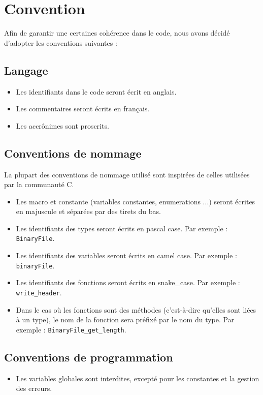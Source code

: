 \section{Convention}

Afin de garantir une certaines cohérence dans le code, nous avons décidé d'adopter les conventions suivantes :

\subsection{Langage}

\begin{itemize}
    \item Les identifiants dans le code seront écrit en anglais.
    \item Les commentaires seront écrits en français.
    \item Les accrônimes sont proscrits.
\end{itemize}


\subsection{Conventions de nommage}

La plupart des conventions de nommage utilisé sont inspirées de celles utilisées par la communauté C.

\begin{itemize}
    \item Les macro et constante (variables constantes, enumerations ...) seront écrites en majuscule et séparées par des tirets du bas.
    \item Les identifiants des types seront écrits en pascal case. Par exemple : \texttt{BinaryFile}.
    \item Les identifiants des variables seront écrits en camel case. Par exemple : \texttt{binaryFile}.
    \item Les identifiants des fonctions seront écrits en snake\_case. Par exemple : \texttt{write_header}.
    \item Dans le cas où les fonctions sont des méthodes (c'est-à-dire qu'elles sont liées à un type), le nom de la fonction sera préfixé par le nom du type. Par exemple : \texttt{BinaryFile\_get\_length}.
\end{itemize}

\subsection{Conventions de programmation}

\begin{itemize}
    \item Les variables globales sont interdites, excepté pour les constantes et la gestion des erreurs.
\end{itemize}